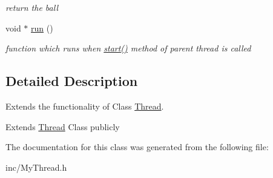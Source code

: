 \begin{DoxyCompactItemize}
\begin{DoxyCompactList}\small\item\em return the ball \end{DoxyCompactList}\item 
\hypertarget{class_my_thread_a136aaa2ce85c45ad4a194a4b9baff8a1}{void $\ast$ \hyperlink{class_my_thread_a136aaa2ce85c45ad4a194a4b9baff8a1}{run} ()}\label{class_my_thread_a136aaa2ce85c45ad4a194a4b9baff8a1}

\begin{DoxyCompactList}\small\item\em function which runs when \hyperlink{class_thread_a7d563f3201d081af8cc24ea552c6a4e4}{start()} method of parent thread is called \end{DoxyCompactList}\end{DoxyCompactItemize}


\subsection{Detailed Description}
Extends the functionality of Class \hyperlink{class_thread}{Thread}. 

Extends \hyperlink{class_thread}{Thread} Class publicly 

The documentation for this class was generated from the following file\-:\begin{DoxyCompactItemize}
\item 
inc/My\-Thread.\-h\end{DoxyCompactItemize}
